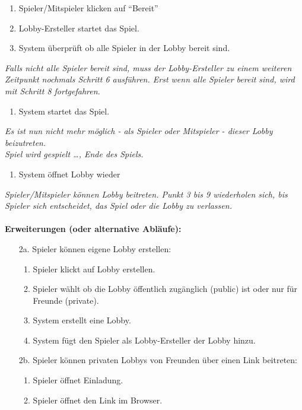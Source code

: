 \documentclass[11pt,ngerman]{article}
\newcommand{\quotes}[1]{``#1''}
\begin{document}
\begin{tcolorbox}
\begin{enumerate}
    		\item Spieler/Mitspieler klicken auf \quotes{Bereit}
    		\item Lobby-Ersteller startet das Spiel.
    		\item System überprüft ob alle Spieler in der \Gls{Lobby} bereit sind.
    	\end{enumerate}
    	\textit{Falls nicht alle Spieler bereit sind, muss der Lobby-Ersteller zu einem weiteren Zeitpunkt nochmals Schritt 6 ausführen. Erst wenn alle Spieler bereit sind, wird mit Schritt 8 fortgefahren.}
    	\begin{enumerate}[resume]
    		\item System startet das Spiel.
    	\end{enumerate}
    	\textit{Es ist nun nicht mehr möglich - als Spieler oder Mitspieler - dieser \Gls{Lobby} beizutreten.} \\
    	\textit{Spiel wird gespielt …, Ende des Spiels.}
    	\begin{enumerate}[resume]
    		\item System öffnet \Gls{Lobby} wieder
    	\end{enumerate}
    	\textit{Spieler/Mitspieler können \Gls{Lobby} beitreten. Punkt 3 bis 9 wiederholen sich, bis Spieler sich entscheidet, das Spiel oder die \Gls{Lobby} zu verlassen.} \\
    	\\ \textbf{Erweiterungen (oder alternative Abläufe):}
    	\begin{itemize}
    		\item[2a.] Spieler können eigene \Gls{Lobby} erstellen:
    		\begin{enumerate}
    			\item Spieler klickt auf \Gls{Lobby} erstellen.
    			\item Spieler wählt ob die \Gls{Lobby} öffentlich zugänglich (public) ist oder nur für Freunde (private).
    			\item System erstellt eine \Gls{Lobby}.
    			\item System fügt den Spieler als Lobby-Ersteller der \Gls{Lobby} hinzu.
    		\end{enumerate}
    		\item[2b.] Spieler können privaten \Glspl{Lobby} von Freunden über einen Link beitreten:
    		\begin{enumerate}
    			\item Spieler öffnet Einladung.
    			\item Spieler öffnet den Link im Browser.

\end{enumerate}
\end{itemize}
\end{tcolorbox}
\end{document}
